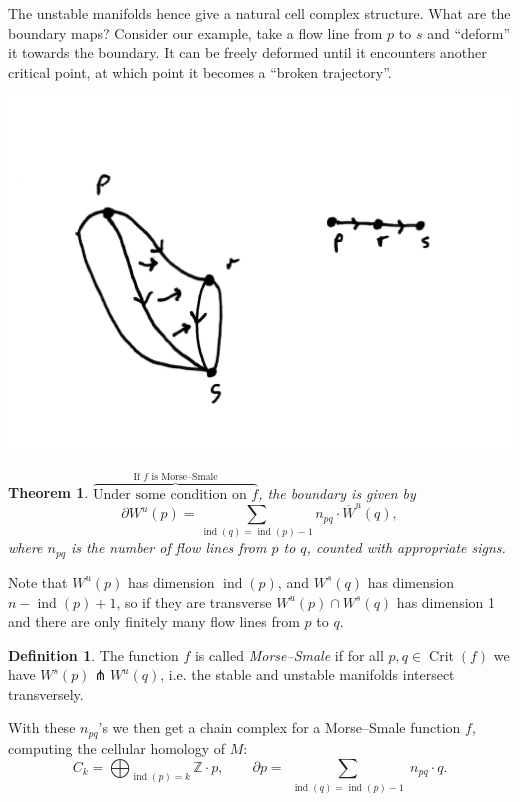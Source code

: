 \documentclass{article}
\newtheorem*{theorem}{Theorem}
\theoremstyle{definition}
\newtheorem*{definition}{Definition}
\DeclareMathOperator{\Crit}{Crit}
\DeclareMathOperator{\ind}{ind}
\newcommand{\Z}{\mathbb{Z}}
\begin{document}
The unstable manifolds hence give a natural cell complex structure. What are the
boundary maps? Consider our example, take a flow line from $p$ to $s$ and
``deform'' it towards the boundary. It can be freely deformed until it
encounters another critical point, at which point it becomes a ``broken
trajectory''.
\begin{center}
    \includegraphics[scale=0.1]{morse_broken}
\end{center}

\begin{theorem}
    $\overbrace{\text{Under some condition on $f$}}
    ^{\text{If $f$ is Morse--Smale}}$, the boundary is given by
    \begin{equation*}
        \partial W^u(p) = \sum_{\ind(q)=\ind(p)-1}n_{pq}\cdot\overline W^u(q),
    \end{equation*}
    where $n_{pq}$ is the number of flow lines from $p$ to $q$, counted with
    appropriate signs.
\end{theorem}

Note that $W^u(p)$ has dimension $\ind(p)$, and $W^s(q)$ has dimension
$n-\ind(p)+1$, so if they are transverse $W^u(p)\cap W^s(q)$ has dimension 1 and
there are only finitely many flow lines from $p$ to $q$.

\begin{definition}
    The function $f$ is called \emph{Morse--Smale} if for all $p,q\in\Crit(f)$
    we have $W^s(p)\pitchfork W^u(q)$, i.e. the stable and unstable manifolds
    intersect transversely.
\end{definition}

With these $n_{pq}$'s we then get a chain complex for a Morse--Smale function
$f$, computing the cellular homology of $M$:
\begin{equation*}
    C_k = \bigoplus_{\ind(p)=k}\Z\cdot p, \qquad
    \partial p=\sum_{\substack{\ind(q)=\ind(p)-1}}n_{pq}\cdot q.
\end{equation*}
\end{document}
